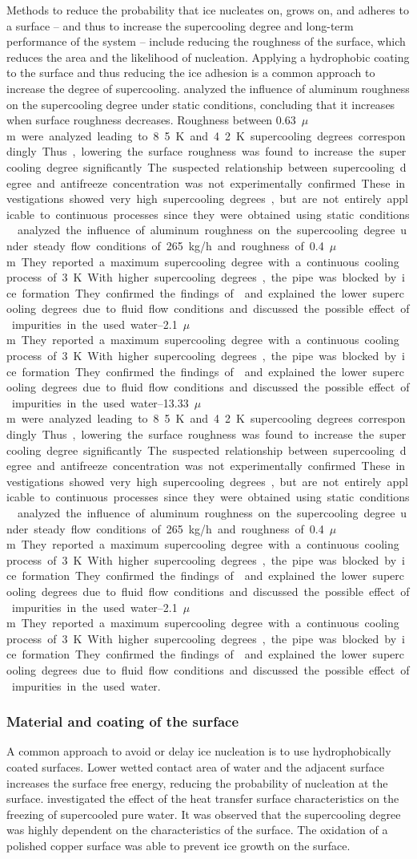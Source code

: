 Methods to reduce the probability that ice nucleates on, grows on, and adheres to a surface -- and thus to increase the supercooling degree and long-term performance of the system -- include reducing the roughness of the surface, which reduces the area and the likelihood of nucleation. Applying a hydrophobic coating to the surface and thus reducing the ice adhesion is a common approach to increase the degree of supercooling.
\cite{faucheux_influence_2006} analyzed the influence of aluminum roughness on the supercooling degree under static conditions, concluding that it increases when surface roughness decreases.
Roughness between \SIrange{0.63}{13.33}{$\mu$m} were analyzed leading to 8.5~K and 4.2~K supercooling degrees correspondingly. Thus, lowering the surface roughness was found to increase the supercooling degree significantly. The suspected relationship between supercooling degree and antifreeze concentration was not experimentally confirmed.
These investigations showed very high supercooling degrees, but are not entirely applicable to continuous processes since they were obtained using static conditions.
\cite{ernst_influence_2016} analyzed the influence of aluminum roughness on the supercooling degree under steady flow conditions of \SI{265}{kg/h} and roughness of \SIrange{0.4}{2.1}{$\mu$m}. They reported a maximum supercooling degree with a continuous cooling process of \SI{3}{K}.  With higher supercooling degrees, the pipe was blocked by ice formation. They confirmed the findings of \cite{faucheux_influence_2006} and explained the lower supercooling degrees due to fluid flow conditions and discussed the possible effect of impurities in the used water.


\subsubsection{Material and coating of the surface}

A common approach to avoid or delay ice nucleation is to use hydrophobically coated surfaces. Lower wetted contact area of water and the adjacent surface increases the surface free energy, reducing the probability of nucleation at the surface. 
\cite{saito_fundamental_1994} investigated the effect of the heat transfer surface characteristics on the freezing of supercooled pure water. It was observed that the supercooling degree was highly dependent on the characteristics of the surface. The oxidation of a polished copper surface was able to prevent ice growth on the surface.

